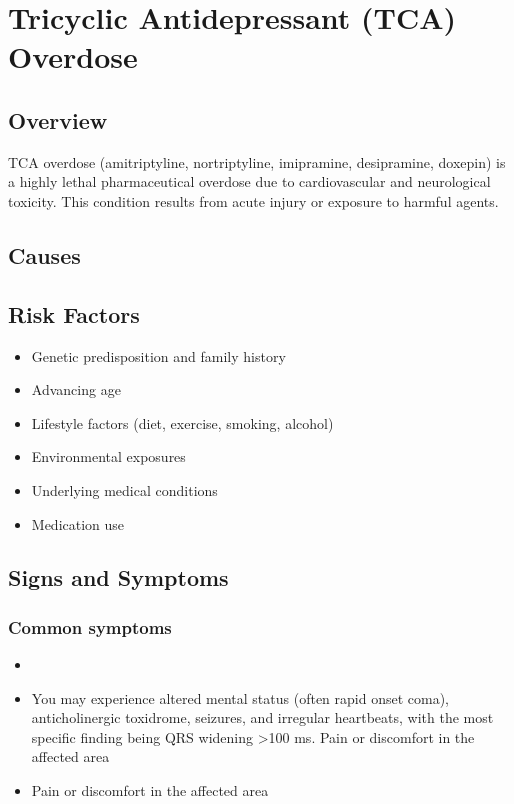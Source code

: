 \chapter{Tricyclic Antidepressant (TCA) Overdose}
\label{sec:TCA Overdose}

\section{Overview}
TCA overdose (amitriptyline, nortriptyline, imipramine, desipramine, doxepin) is a highly lethal pharmaceutical overdose due to cardiovascular and neurological toxicity. This condition results from acute injury or exposure to harmful agents.
\section{Causes}
\section{Risk Factors}

\begin{itemize}[noitemsep]
  \item Genetic predisposition and family history
  \item Advancing age
  \item Lifestyle factors (diet, exercise, smoking, alcohol)
  \item Environmental exposures
  \item Underlying medical conditions
  \item Medication use
\end{itemize}
\section{Signs and Symptoms}

\subsection{Common symptoms}
\begin{itemize}[noitemsep]
  \item \item You may experience altered mental status (often rapid onset coma), anticholinergic toxidrome, seizures, and irregular heartbeats, with the most specific finding being QRS widening >100 ms. Pain or discomfort in the affected area    \item Pain or discomfort in the affected area
  \end{itemize}

